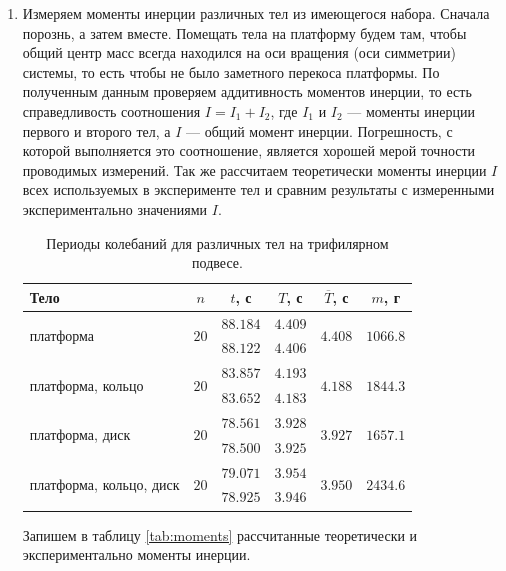 \documentclass[a4paper,12pt]{article}
\begin{document}
\begin{enumerate}
	\item
	Измеряем моменты инерции различных тел из имеющегося набора. Сначала порознь, а затем вместе. Помещать тела на платформу будем там, чтобы общий центр масс всегда находился на оси вращения (оси симметрии) системы, то есть чтобы не было заметного перекоса платформы. По полученным данным проверяем аддитивность моментов инерции, то есть справедливость соотношения $I = I_1 + I_2$, где $I_1$ и $I_2$ --- моменты инерции первого и второго тел, а $I$ --- общий момент инерции. Погрешность, с которой выполняется это соотношение, является хорошей мерой точности проводимых измерений. Так же рассчитаем теоретически моменты инерции $I$ всех используемых в эксперименте тел и сравним результаты с измеренными экспериментально значениями $I$.
	\begin{table}[ht!]
		\centering
		\begin{tabular}{|l|c|c|c|c|c|}
			\hline
			Тело & $n$ & $t$, с & $T$, с & $\overline{T}$, с & $m$, г \\ \hline
			\multirow{2}{*}{платформа} & \multirow{2}{*}{$20$} & $88.184$ & $4.409$ & \multirow{2}{*}{$4.408$} & \multirow{2}{*}{$1066.8$} \\
			 & & $88.122$ & $4.406$ & \\ \hline
			\multirow{2}{*}{платформа, кольцо} & \multirow{2}{*}{$20$} & $83.857$ & $4.193$ & \multirow{2}{*}{$4.188$} & \multirow{2}{*}{$1844.3$} \\
			 & & $83.652$ & $4.183$ & \\ \hline
			\multirow{2}{*}{платформа, диск} & \multirow{2}{*}{$20$} & $78.561$ & $3.928$ & \multirow{2}{*}{$3.927$} & \multirow{2}{*}{$1657.1$} \\
			 & & $78.500$ & $3.925$ & \\ \hline
			\multirow{2}{*}{платформа, кольцо, диск} & \multirow{2}{*}{$20$} & $79.071$ & $3.954$ & \multirow{2}{*}{$3.950$} & \multirow{2}{*}{$2434.6$} \\
			 & & $78.925$ & $3.946$ & \\ \hline
		\end{tabular}
		\caption{Периоды колебаний для различных тел на трифилярном подвесе.}
		\label{tab:periods_diff_body}
	\end{table}

	Запишем в таблицу \ref{tab:moments} рассчитанные теоретически и экспериментально моменты инерции.
	

\end{enumerate}
\end{document}
